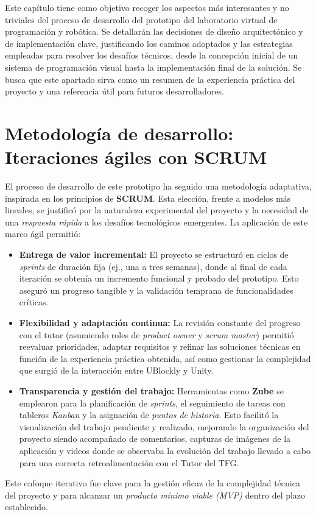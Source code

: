 
Este capítulo tiene como objetivo recoger los aspectos más interesantes y no triviales del proceso de desarrollo del prototipo del laboratorio virtual de programación y robótica. Se detallarán las decisiones de diseño arquitectónico y de implementación clave, justificando los caminos adoptados y las estrategias empleadas para resolver los desafíos técnicos, desde la concepción inicial de un sistema de programación visual hasta la implementación final de la solución. Se busca que este apartado sirva como un resumen de la experiencia práctica del proyecto y una referencia útil para futuros desarrolladores.

\section{Metodología de desarrollo: Iteraciones ágiles con SCRUM}
El proceso de desarrollo de este prototipo ha seguido una metodología adaptativa, inspirada en los principios de \textbf{SCRUM}. Esta elección, frente a modelos más lineales, se justificó por la naturaleza experimental del proyecto y la necesidad de una \textit{respuesta rápida} a los desafíos tecnológicos emergentes. La aplicación de este marco ágil permitió:
\begin{itemize}
	\item \textbf{Entrega de valor incremental:} El proyecto se estructuró en ciclos de \textit{sprints} de duración fija (ej., una a tres semanas), donde al final de cada iteración se obtenía un incremento funcional y probado del prototipo. Esto aseguró un progreso tangible y la validación temprana de funcionalidades críticas.
	\item \textbf{Flexibilidad y adaptación continua:} La revisión constante del progreso con el tutor (asumiendo roles de \textit{product owner} y \textit{scrum master}) permitió reevaluar prioridades, adaptar requisitos y refinar las soluciones técnicas en función de la experiencia práctica obtenida, así como gestionar la complejidad que surgió de la interacción entre UBlockly y Unity.
	\item \textbf{Transparencia y gestión del trabajo:} Herramientas como \textbf{Zube} \cite{ZubePlatform} se emplearon para la planificación de \textit{sprints}, el seguimiento de tareas con tableros \textit{Kanban} y la asignación de \textit{puntos de historia}. Esto facilitó la visualización del trabajo pendiente y realizado, mejorando la organización del proyecto siendo acompañado de comentarios, capturas de imágenes de la aplicación y videos donde se observaba la evolución del trabajo llevado a cabo para una correcta retroalimentación con el Tutor del TFG.
\end{itemize}
Este enfoque iterativo fue clave para la gestión eficaz de la complejidad técnica del proyecto y para alcanzar un \textit{producto mínimo viable (MVP)} dentro del plazo establecido.

